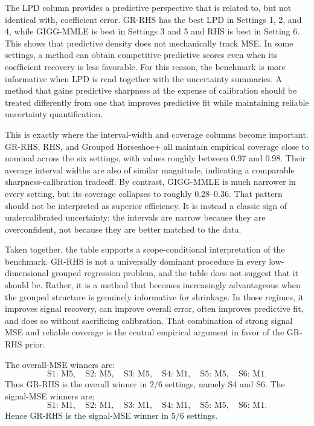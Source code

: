 \documentclass[11pt]{article}
\begin{document}
The LPD column provides a predictive perspective that is related to, but not
identical with, coefficient error. GR-RHS has the best LPD in Settings 1, 2,
and 4, while GIGG-MMLE is best in Settings 3 and 5 and RHS is best in Setting
6. This shows that predictive density does not mechanically track MSE. In some
settings, a method can obtain competitive predictive scores even when its
coefficient recovery is less favorable. For this reason, the benchmark is more
informative when LPD is read together with the uncertainty summaries. A method
that gains predictive sharpness at the expense of calibration should be treated
differently from one that improves predictive fit while maintaining reliable
uncertainty quantification.

This is exactly where the interval-width and coverage columns become important.
GR-RHS, RHS, and Grouped Horseshoe+ all maintain empirical coverage close to
nominal across the six settings, with values roughly between 0.97 and 0.98.
Their average interval widths are also of similar magnitude, indicating a
comparable sharpness-calibration tradeoff. By contrast, GIGG-MMLE is much
narrower in every setting, but its coverage collapses to roughly 0.28--0.36.
That pattern should not be interpreted as superior efficiency. It is instead a
classic sign of undercalibrated uncertainty: the intervals are narrow because
they are overconfident, not because they are better matched to the data.

Taken together, the table supports a scope-conditional interpretation of the
benchmark. GR-RHS is not a universally dominant procedure in every low-
dimensional grouped regression problem, and the table does not suggest that it
should be. Rather, it is a method that becomes increasingly advantageous when
the grouped structure is genuinely informative for shrinkage. In those regimes,
it improves signal recovery, can improve overall error, often improves
predictive fit, and does so without sacrificing calibration. That combination
of strong signal MSE and reliable coverage is the central empirical argument in
favor of the GR-RHS prior.

The overall-MSE winners are:
\[
  \text{S1: M5},\quad
  \text{S2: M5},\quad
  \text{S3: M5},\quad
  \text{S4: M1},\quad
  \text{S5: M5},\quad
  \text{S6: M1}.
\]
Thus GR-RHS is the overall winner in \(2/6\) settings, namely S4 and S6. The
signal-MSE winners are:
\[
  \text{S1: M1},\quad
  \text{S2: M1},\quad
  \text{S3: M1},\quad
  \text{S4: M1},\quad
  \text{S5: M5},\quad
  \text{S6: M1}.
\]
Hence GR-RHS is the signal-MSE winner in \(5/6\) settings.
\end{document}
